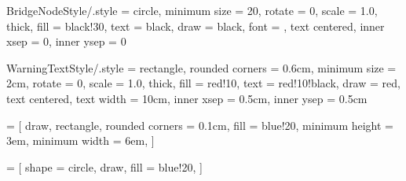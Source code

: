 \tikzset
{
    BridgeNodeStyle/.style =
    {
        circle,                                 %
        minimum size    = 20,                   %
        rotate          = 0,                    %
        scale           = 1.0,                  %
        thick,                                  %
        fill            = black!30,             %
        text            = black,                %
        draw            = black,                %
        font            = \small,               %
        text centered,                          %
        inner xsep      = 0,                    %
        inner ysep      = 0                     %
    }
}






\tikzset
{
    WarningTextStyle/.style =
    {
        rectangle,                      %
        rounded corners = 0.6cm,        %
        minimum size    = 2cm,          %
        rotate          = 0,            %
        scale           = 1.0,          %
        thick,                          %
        fill            = red!10,       %
        text            = red!10!black, %
        draw            = red,          %
        text centered,                  %
        text width      = 10cm,         %
        inner xsep      = 0.5cm,        %
        inner ysep      = 0.5cm         %
    }
}




 =
[
    draw,
    rectangle,
    rounded corners = 0.1cm,
    fill            = blue!20,
    minimum height  = 3em,
    minimum width   = 6em,
]





 =
[
    shape           = circle,
    draw,
    fill            = blue!20,
]




